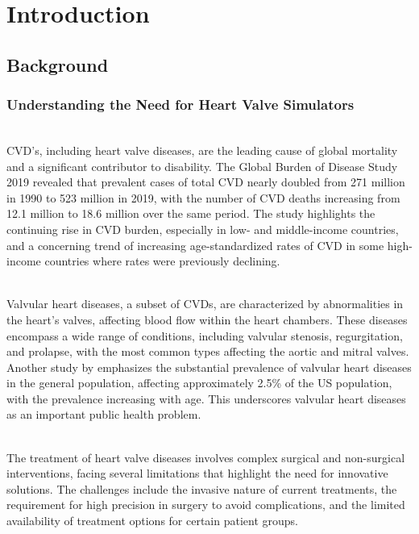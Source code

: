 \chapter{Introduction}\label{chap:intro}

\section{Background}

\subsection{Understanding the Need for Heart Valve Simulators}
\\
\gls{CVD}'s, including heart valve diseases, are the leading cause of global mortality and a significant contributor to disability. The Global Burden of Disease Study 2019 revealed that prevalent cases of total \gls{CVD} nearly doubled from 271 million in 1990 to 523 million in 2019, with the number of \gls{CVD} deaths increasing from 12.1 million to 18.6 million over the same period. The study highlights the continuing rise in \gls{CVD} burden, especially in low- and middle-income countries, and a concerning trend of increasing age-standardized rates of \gls{CVD} in some high-income countries where rates were previously declining.

\\
Valvular heart diseases, a subset of \gls{CVD}s, are characterized by abnormalities in the heart's valves, affecting blood flow within the heart chambers. These diseases encompass a wide range of conditions, including valvular stenosis, regurgitation, and prolapse, with the most common types affecting the aortic and mitral valves.
Another study by  emphasizes the substantial prevalence of valvular heart diseases in the general population, affecting approximately 2.5\% of the US population, with the prevalence increasing with age. This underscores valvular heart diseases as an important public health problem.

\\
The treatment of heart valve diseases involves complex surgical and non-surgical interventions, facing several limitations that highlight the need for innovative solutions. The challenges include the invasive nature of current treatments, the requirement for high precision in surgery to avoid complications, and the limited availability of treatment options for certain patient groups. 

